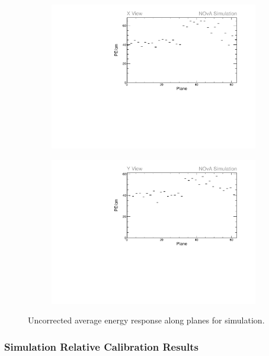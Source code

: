 \begin{figure}[h]
\centering
\begin{subfigure}[b]{0.495\textwidth}
\centering
\includegraphics[width=\textwidth]{Plots/TBCalibration/Attenprofs_Simulation_PlanePE_X_Prof.pdf}
\end{subfigure}
\begin{subfigure}[b]{0.495\textwidth}
\centering
\includegraphics[width=\textwidth]{Plots/TBCalibration/Attenprofs_Simulation_PlanePE_Y_Prof.pdf}
\end{subfigure}
\caption{Uncorrected average energy response along planes for simulation.}
\label{fig:CalibhistPlanePE_simulation}
\end{figure}

\subsubsection*{Simulation Relative Calibration Results}

